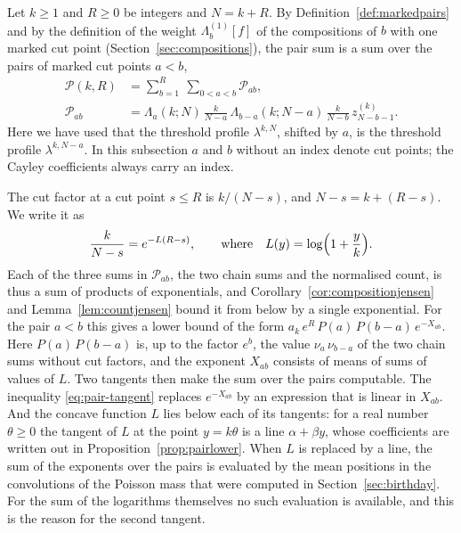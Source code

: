 \documentclass{amsart}
\theoremstyle{definition}
\theoremstyle{remark}
\numberwithin{equation}{section}
\begin{document}
Let $k\ge1$ and $R\ge0$ be integers and $N=k+R$.
By Definition~\ref{def:markedpairs} and by the definition of the weight
$\Lambda^{(1)}_b[f]$ of the compositions of $b$ with one marked cut point
(Section~\ref{sec:compositions}), the pair sum is a sum over the pairs of
marked cut points $a<b$,
\begin{equation}\label{eq:pair-terms}
\begin{split}
\mathcal P(k,R)&=\sum_{b=1}^{R}\ \sum_{0<a<b}\mathcal P_{ab},\\
\mathcal P_{ab}&=\Lambda_a(k;N)\,\frac{k}{N-a}\,\Lambda_{b-a}(k;N-a)\,
\frac{k}{N-b}\,z^{(k)}_{N-b-1}.
\end{split}
\end{equation}
Here we have used that the threshold profile $\lambda^{k,N}$, shifted by $a$,
is the threshold profile $\lambda^{k,N-a}$. In this subsection $a$ and $b$
without an index denote cut points; the Cayley coefficients always carry an
index.

The cut factor at a cut point
$s\le R$ is $k/(N-s)$, and $N-s=k+(R-s)$. We write it as
\[
\frac{k}{N-s}=e^{-L(R-s)},\qquad\text{where}\quad
L(y)=\log\Bigl(1+\frac yk\Bigr).
\]
Each of the three sums in $\mathcal P_{ab}$, the two chain sums and the normalised
count, is thus a sum of products of exponentials, and
Corollary~\ref{cor:compositionjensen} and Lemma~\ref{lem:countjensen} bound
it from below by a single exponential. For the pair $a<b$ this gives a lower
bound of the form $a_k\,e^{R}\,P(a)\,P(b-a)\,e^{-X_{ab}}$. Here
$P(a)\,P(b-a)$ is, up to the factor $e^{b}$, the value $\nu_a\,\nu_{b-a}$ of
the two chain sums without cut factors, and the exponent $X_{ab}$ consists
of means of sums of values of $L$. Two tangents then make the sum over the
pairs computable. The inequality \eqref{eq:pair-tangent} replaces
$e^{-X_{ab}}$ by an expression that is linear in $X_{ab}$. And the concave
function $L$ lies below each of its tangents: for a real number
$\theta\ge0$ the tangent of $L$ at the point $y=k\theta$ is a line
$\alpha+\beta y$, whose coefficients are written out in
Proposition~\ref{prop:pairlower}. When $L$ is replaced by a line, the sum
of the exponents over the pairs is evaluated by the mean positions in the
convolutions of the Poisson mass that were computed in
Section~\ref{sec:birthday}. For the sum of the logarithms themselves no such
evaluation is available, and this is the reason for the second tangent.
\end{document}
